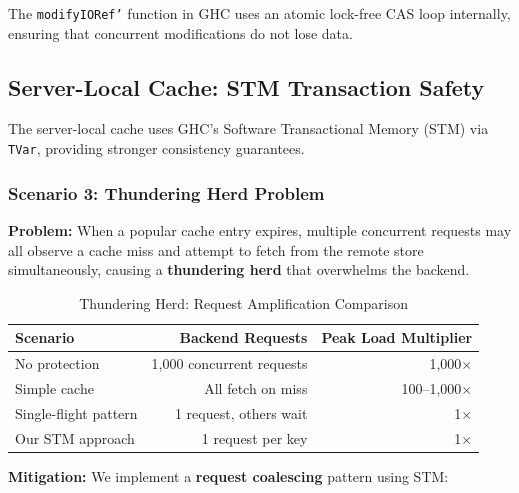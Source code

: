 \documentclass[12pt,a4paper]{report}
\begin{document}
The \texttt{modifyIORef'} function in GHC uses an atomic lock-free CAS loop internally, ensuring that concurrent modifications do not lose data.

\subsection{Server-Local Cache: STM Transaction Safety}

The server-local cache uses GHC's Software Transactional Memory (STM) via \texttt{TVar}, providing stronger consistency guarantees.

\subsubsection{Scenario 3: Thundering Herd Problem}

\textbf{Problem:} When a popular cache entry expires, multiple concurrent requests may all observe a cache miss and attempt to fetch from the remote store simultaneously, causing a \textbf{thundering herd} that overwhelms the backend.

\begin{table}[h]
\centering
\begin{tabular}{@{} l r r @{}}
\toprule
\textbf{Scenario} & \textbf{Backend Requests} & \textbf{Peak Load Multiplier} \\
\midrule
No protection & 1,000 concurrent requests & 1,000$\times$ \\
Simple cache & All fetch on miss & 100--1,000$\times$ \\
Single-flight pattern & 1 request, others wait & 1$\times$ \\
Our STM approach & 1 request per key & 1$\times$ \\
\bottomrule
\end{tabular}
\caption{Thundering Herd: Request Amplification Comparison}
\label{tab:thundering-herd}
\end{table}

\textbf{Mitigation:} We implement a \textbf{request coalescing} pattern using STM:
\end{document}

